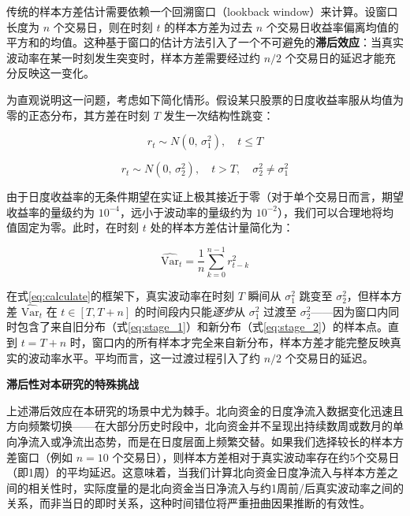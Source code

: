 \documentclass{article}
\begin{document}
传统的样本方差估计需要依赖一个回溯窗口（lookback window）来计算。设窗口长度为 $n$ 个交易日，则在时刻 $t$ 的样本方差为过去 $n$ 个交易日收益率偏离均值的平方和的均值。这种基于窗口的估计方法引入了一个不可避免的\textbf{滞后效应}：当真实波动率在某一时刻发生突变时，样本方差需要经过约 $n/2$ 个交易日的延迟才能充分反映这一变化。

为直观说明这一问题，考虑如下简化情形。假设某只股票的日度收益率服从均值为零的正态分布，其方差在时刻 $T$ 发生一次结构性跳变：

\begin{equation}
    r_t \sim N(0,\, \sigma_1^2), \quad t \leq T
    \label{eq:stage_1}
\end{equation}

\begin{equation}
    r_t \sim N(0,\, \sigma_2^2), \quad t > T, \quad \sigma_2^2 \neq \sigma_1^2
    \label{eq:stage_2}
\end{equation}

由于日度收益率的无条件期望在实证上极其接近于零（对于单个交易日而言，期望收益率的量级约为 $10^{-4}$，远小于波动率的量级约为 $10^{-2}$），我们可以合理地将均值固定为零。此时，在时刻 $t$ 处的样本方差估计量简化为：

\begin{equation}
    \widehat{\text{Var}}_t = \frac{1}{n}\sum_{k=0}^{n-1} r_{t-k}^2
    \label{eq:calculate}
\end{equation}

在式\ref{eq:calculate}的框架下，真实波动率在时刻 $T$ 瞬间从 $\sigma_1^2$ 跳变至 $\sigma_2^2$，但样本方差 $\widehat{\text{Var}}_t$ 在 $t \in [T, T+n]$ 的时间段内只能\textit{逐步}从 $\sigma_1^2$ 过渡至 $\sigma_2^2$——因为窗口内同时包含了来自旧分布（式\ref{eq:stage_1}）和新分布（式\ref{eq:stage_2}）的样本点。直到 $t = T + n$ 时，窗口内的所有样本才完全来自新分布，样本方差才能完整反映真实的波动率水平。平均而言，这一过渡过程引入了约 $n/2$ 个交易日的延迟。

\vspace{0.5em}
\noindent\textbf{滞后性对本研究的特殊挑战}

上述滞后效应在本研究的场景中尤为棘手。北向资金的日度净流入数据变化迅速且方向频繁切换——在大部分历史时段中，北向资金并不呈现出持续数周或数月的单向净流入或净流出态势，而是在日度层面上频繁交替。如果我们选择较长的样本方差窗口（例如 $n = 10$ 个交易日），则样本方差相对于真实波动率存在约5个交易日（即1周）的平均延迟。这意味着，当我们计算北向资金日度净流入与样本方差之间的相关性时，实际度量的是北向资金当日净流入与约1周前/后真实波动率之间的关系，而非当日的即时关系，这种时间错位将严重扭曲因果推断的有效性。
\end{document}
